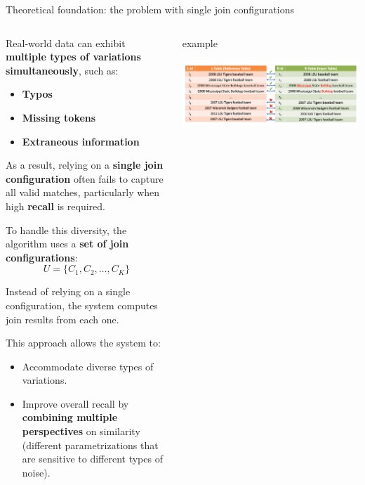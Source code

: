 \documentclass[8pt]{beamer} %
\begin{document}
\begin{frame}{Theoretical foundation: the problem with single join configurations}
	
	\begin{columns}
		\begin{column}{0.52\textwidth}
			Real-world data can exhibit \textbf{multiple types of variations simultaneously}, such as:
			\begin{itemize}
				\item \textbf{Typos}
				\item \textbf{Missing tokens}
				\item \textbf{Extraneous information}
			\end{itemize}
			
			As a result, relying on a \textbf{single join configuration} often fails to capture all valid matches, particularly when high \textbf{recall} is required.
			
			\vspace{0.5em}
			To handle this diversity, the algorithm uses a \textbf{set of join configurations}:
			$$
			U = \{C_1, C_2, \dots, C_K\}
			$$
			
			Instead of relying on a single configuration, the system computes join results from each one.
			
			This approach allows the system to:
			\begin{itemize}
				\item Accommodate diverse types of variations.
				\item Improve overall recall by \textbf{combining multiple perspectives} on similarity (different parametrizations that are sensitive to different types of noise).
			\end{itemize}
		\end{column}
		
		
		\begin{column}{0.45\textwidth}
			
			\begin{beamercolorbox}[rounded=true, shadow=true, leftskip=1em, rightskip=1em]{example}
			
				\centering
				\includegraphics[width=\linewidth]{img/img-single-join-problems.png}
				

\end{beamercolorbox}
\end{column}
\end{columns}
\end{frame}
\end{document}
